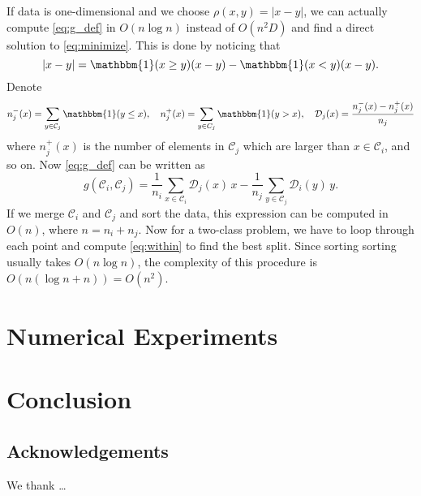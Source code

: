 \documentclass{article}
\newcommand\C{{\mathcal{C}}}
\begin{document}
If data is one-dimensional and we choose
$\rho(x,y) = |x - y|$, we can actually compute 
\eqref{eq:g_def} in $O(n \log n)$ instead of $O(n^2 D)$ and find
a direct solution to \eqref{eq:minimize}. 
This is done by noticing that
\begin{equation}
|x - y|  = \mathbbm{1}(x \ge y ) (x - y) -
\mathbbm{1}(x < y) (x - y).
\end{equation}
Denote
\begin{equation}
n_j^{-} (x) = \sum_{y \in \C_j} \mathbbm{1}(y \le x), \quad  
n_j^{+} (x) = \sum_{y \in C_j} \mathbbm{1}(y > x), \quad
\mathcal{D}_j(x) = \dfrac{n_j^-(x) - n_j^+(x)}{n_j}
\end{equation}
where $n_j^+(x)$ is the number of elements in $\C_j$ which are larger
than $x \in \C_i$, and so on.
Now \eqref{eq:g_def} can be written as
\begin{equation}
\label{eq:g1d}
g(\C_i, \C_j) = 
\dfrac{1}{n_i} \sum_{x \in \C_i} \mathcal{D}_j(x) \, x - 
\dfrac{1}{n_j} \sum_{y \in \C_j} \mathcal{D}_i(y) \, y.
\end{equation}
If we merge $\C_i$ and $\C_j$ and sort the data, this expression 
can be computed in $O(n)$, where $n=n_i+n_j$.
Now for a two-class problem, we have to loop through each point
and compute \eqref{eq:within} to find the best split. Since sorting
sorting usually takes $O(n \log n)$, the complexity of
this procedure is $O(n(\log n + n)) = O(n^2)$.

\section{Numerical Experiments}

\section{Conclusion}


\subsection*{Acknowledgements}
We thank \ldots




\end{document}
